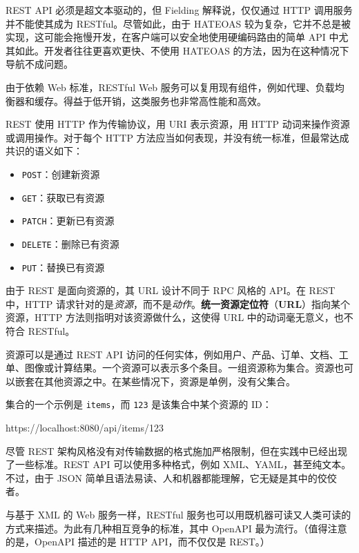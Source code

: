 \label{idx:1626}
REST API 必须是超文本驱动的，但 Fielding 解释说，仅仅通过 HTTP 调用服务并不能使其成为 RESTful。尽管如此，由于 HATEOAS 较为复杂，它并不总是被实现，这可能会拖慢开发，在客户端可以安全地使用硬编码路由的简单 API 中尤其如此。开发者往往更喜欢更快、不使用 HATEOAS 的方法，因为在这种情况下导航不成问题。

由于依赖 Web 标准，RESTful Web 服务可以复用现有组件，例如代理、负载均衡器和缓存。得益于低开销，这类服务也非常高性能和高效。

\label{idx:1627}
REST 使用 HTTP 作为传输协议，用 URI 表示资源，用 HTTP 动词来操作资源或调用操作。对于每个 HTTP 方法应当如何表现，并没有统一标准，但最常达成共识的语义如下：

\begin{itemize}
\item \texttt{POST}：创建新资源
\item \texttt{GET}：获取已有资源
\item \texttt{PATCH}：更新已有资源
\item \texttt{DELETE}：删除已有资源
\item \texttt{PUT}：替换已有资源
\end{itemize}

\label{idx:1628}
由于 REST 是面向资源的，其 URL 设计不同于 RPC 风格的 API。在 REST 中，HTTP 请求针对的是\emph{资源}，而不是\emph{动作}。\textbf{统一资源定位符}（\textbf{URL}）指向某个资源，HTTP 方法则指明对该资源做什么，这使得 URL 中的动词毫无意义，也不符合 RESTful。

\label{idx:1629}
资源可以是通过 REST API 访问的任何实体，例如用户、产品、订单、文档、工单、图像或计算结果。一个资源可以表示多个条目。一组资源称为集合。资源也可以嵌套在其他资源之中。在某些情况下，资源是单例，没有父集合。

集合的一个示例是 \texttt{items}，而 \texttt{123} 是该集合中某个资源的 ID：

\begin{codebox}[text]
https://localhost:8080/api/items/123
\end{codebox}

尽管 REST 架构风格没有对传输数据的格式施加严格限制，但在实践中已经出现了一些标准。REST API 可以使用多种格式，例如 XML、YAML，甚至纯文本。不过，由于 JSON 简单且语法易读、人和机器都能理解，它无疑是其中的佼佼者。

与基于 XML 的 Web 服务一样，RESTful 服务也可以用既机器可读又人类可读的方式来描述。为此有几种相互竞争的标准，其中 OpenAPI 最为流行。（值得注意的是，OpenAPI 描述的是 HTTP API，而不仅仅是 REST。）

